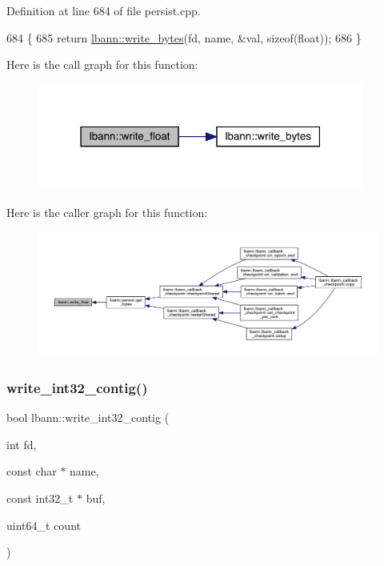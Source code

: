 Definition at line 684 of file persist.\+cpp.


\begin{DoxyCode}
684                                                            \{
685   \textcolor{keywordflow}{return} \hyperlink{namespacelbann_aed95061796f19fa1648dcc99dc335abd}{lbann::write\_bytes}(fd, name, &val, \textcolor{keyword}{sizeof}(\textcolor{keywordtype}{float}));
686 \}
\end{DoxyCode}
Here is the call graph for this function\+:\nopagebreak
\begin{figure}[H]
\begin{center}
\leavevmode
\includegraphics[width=304pt]{namespacelbann_a73339e4587f8ce7f653be03a3a6cbcd0_cgraph}
\end{center}
\end{figure}
Here is the caller graph for this function\+:\nopagebreak
\begin{figure}[H]
\begin{center}
\leavevmode
\includegraphics[width=350pt]{namespacelbann_a73339e4587f8ce7f653be03a3a6cbcd0_icgraph}
\end{center}
\end{figure}
\mbox{\label{namespacelbann_a917727ad7e4f0dfd6d5a609cdc6dd9e2}} 
\subsubsection{\texorpdfstring{write\+\_\+int32\+\_\+contig()}{write\_int32\_contig()}}
{\footnotesize\ttfamily bool lbann\+::write\+\_\+int32\+\_\+contig (\begin{DoxyParamCaption}\item[{int}]{fd,  }\item[{const char $\ast$}]{name,  }\item[{const int32\+\_\+t $\ast$}]{buf,  }\item[{uint64\+\_\+t}]{count }\end{DoxyParamCaption})}



